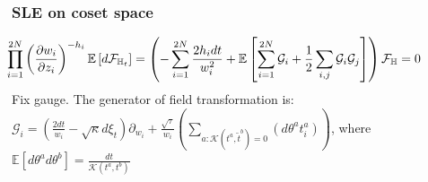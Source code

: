 \documentclass[pdftex]{beamer}
\newcommand{\gf}{\mathfrak{g}}
\newcommand{\af}{\mathfrak{a}}
\theoremstyle{definition} \newtheorem{Def}{Definition}
\begin{document}
\begin{frame}
\vspace{-1cm}
  \frametitle{SLE on coset space}
  \begin{multline*}
    \hspace{-1.3cm}
    \prod_{i=1}^{2N}\left(\frac{\partial w_{i}}{\partial z_{i}}\right)^{-h_{i}}\mathbb{E}\left[d 
      \mathcal{F}_{\mathbb{H}_{t}}\right]=
    \left(-\sum_{i=1}^{2N}\frac{2h_{i}dt}{w_{i}^{2}}+\mathbb{E}\left[\sum_{i=1}^{2N}\mathcal{G}_{i}+\frac{1}{2}
        \sum_{i,j}\mathcal{G}_{i}\mathcal{G}_{j}\right]\right)\mathcal{F}_{\mathbb{H}} = 0
  \end{multline*}
  Fix gauge. The generator of field transformation is:
$\mathcal{G}_{i}=\left(\frac{2dt}{w_{i}}-\sqrt{\kappa}
  d\xi_{t}\right) \partial_{w_{i}}+\frac{\sqrt{\tau}}{w_{i}}\left(\sum\limits_{a:\mathcal{K}(t^{a},\tilde{t}^{b})=0}\left(d
    \theta ^{a} t^{a}_{i}\right)\right)$, where  $\mathbb{E}[d\theta^{a}d\theta^{b}]=\frac{dt}{\mathcal{K}(t^{a},t^{b})}$



\end{frame}
\end{document}
